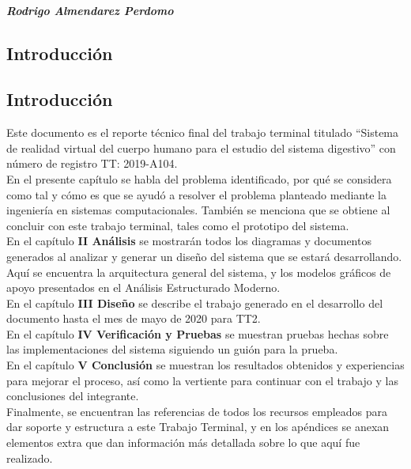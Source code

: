 \documentclass[11pt]{report}
\begin{document}
\paragraph{Rodrigo Almendarez Perdomo}
\vfill

\tableofcontents

\begin{center}
\chapter{Introducci\'on}
\end{center}

\newpage 
\section*{Introducci\'on}
\vfill
Este documento es el reporte técnico final del trabajo terminal titulado “Sistema de realidad virtual del cuerpo humano para el estudio del sistema digestivo” con número de registro TT: 2019-A104.\\
\newline
En el presente capítulo se habla del problema identificado, por qué se considera como tal y cómo es que se ayudó a resolver el problema planteado mediante la ingeniería en sistemas computacionales. También se menciona que se obtiene al concluir con este trabajo terminal, tales como el prototipo del sistema.\\
\newline
En el capítulo \textbf{II Análisis} se mostrarán todos los diagramas y documentos generados al analizar y generar un diseño del sistema que se estará desarrollando. Aquí se encuentra la arquitectura general del sistema, y los modelos gráficos de apoyo presentados en el Análisis Estructurado Moderno.\\
\newline
En el capítulo \textbf{III Diseño} se describe el trabajo generado en el desarrollo del documento hasta el mes de mayo de 2020 para TT2.\\
\newline
En el capítulo \textbf{IV Verificación y Pruebas} se muestran pruebas hechas sobre las implementaciones del sistema siguiendo un guión para la prueba.
 \newline\\
En el capítulo \textbf{V Conclusión} se muestran los resultados obtenidos y experiencias para mejorar el proceso, así como la vertiente para continuar con el trabajo y las conclusiones del integrante.
\newline\\
Finalmente, se encuentran las referencias de todos los recursos empleados para dar soporte y estructura a este Trabajo Terminal, y en los apéndices se anexan elementos extra que dan información más detallada sobre lo que aquí fue realizado.\\
\vfill 
\end{document}
